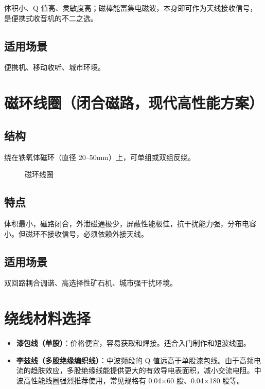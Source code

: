 \documentclass[12pt,UTF8]{ctexbook}
\begin{document}
体积小、Q 值高、灵敏度高；磁棒能富集电磁波，本身即可作为天线接收信号，是便携式收音机的不二之选。

\subsection{适用场景}

便携机、移动收听、城市环境。


\section{磁环线圈（闭合磁路，现代高性能方案）}

\subsection{结构}

绕在铁氧体磁环（直径 20–50mm）上，可单组或双组反绕。

\begin{figure}[H]
	\centering
	\caption{磁环线圈}
	\label{fig:toroidal-coil}
\end{figure}

\subsection{特点}

体积最小，磁路闭合，外泄磁通极少，屏蔽性能极佳，抗干扰能力强，分布电容小。但磁环不接收信号，必须依赖外接天线。

\subsection{适用场景}

双回路耦合调谐、高选择性矿石机、城市强干扰环境。


\section{绕线材料选择}

\begin{itemize}[leftmargin=2cm]
	\item \textbf{漆包线（单股）}：价格便宜，容易获取和焊接。适合入门制作和短波线圈。
	\item \textbf{李兹线（多股绝缘编织线）}：中波频段的 Q 值远高于单股漆包线。由于高频电流的趋肤效应，多股绝缘线能提供更大的有效导电表面积，减小交流电阻。中波高性能线圈强烈推荐使用，常见规格有 0.04×60 股、0.04×180 股等。
\end{itemize}
\end{document}
